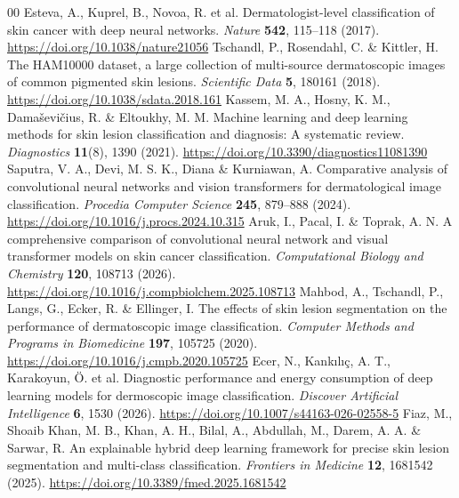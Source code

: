 \documentclass[conference]{IEEEtran}
\begin{document}
\begin{thebibliography}{00}
 Esteva, A., Kuprel, B., Novoa, R. et al. Dermatologist-level classification of skin cancer with deep neural networks. \textit{Nature} \textbf{542}, 115--118 (2017). \url{https://doi.org/10.1038/nature21056}
 Tschandl, P., Rosendahl, C. \& Kittler, H. The HAM10000 dataset, a large collection of multi-source dermatoscopic images of common pigmented skin lesions. \textit{Scientific Data} \textbf{5}, 180161 (2018). \url{https://doi.org/10.1038/sdata.2018.161}
 Kassem, M. A., Hosny, K. M., Damaševičius, R. \& Eltoukhy, M. M. Machine learning and deep learning methods for skin lesion classification and diagnosis: A systematic review. \textit{Diagnostics} \textbf{11}(8), 1390 (2021). \url{https://doi.org/10.3390/diagnostics11081390}
 Saputra, V. A., Devi, M. S. K., Diana \& Kurniawan, A. Comparative analysis of convolutional neural networks and vision transformers for dermatological image classification. \textit{Procedia Computer Science} \textbf{245}, 879--888 (2024). \url{https://doi.org/10.1016/j.procs.2024.10.315}
 Aruk, I., Pacal, I. \& Toprak, A. N. A comprehensive comparison of convolutional neural network and visual transformer models on skin cancer classification. \textit{Computational Biology and Chemistry} \textbf{120}, 108713 (2026). \url{https://doi.org/10.1016/j.compbiolchem.2025.108713}
 Mahbod, A., Tschandl, P., Langs, G., Ecker, R. \& Ellinger, I. The effects of skin lesion segmentation on the performance of dermatoscopic image classification. \textit{Computer Methods and Programs in Biomedicine} \textbf{197}, 105725 (2020). \url{https://doi.org/10.1016/j.cmpb.2020.105725}
 Ecer, N., Kankılıç, A. T., Karakoyun, Ö. et al. Diagnostic performance and energy consumption of deep learning models for dermoscopic image classification. \textit{Discover Artificial Intelligence} \textbf{6}, 1530 (2026). \url{https://doi.org/10.1007/s44163-026-02558-5}
 Fiaz, M., Shoaib Khan, M. B., Khan, A. H., Bilal, A., Abdullah, M., Darem, A. A. \& Sarwar, R. An explainable hybrid deep learning framework for precise skin lesion segmentation and multi-class classification. \textit{Frontiers in Medicine} \textbf{12}, 1681542 (2025). \url{https://doi.org/10.3389/fmed.2025.1681542}
\end{thebibliography}
\end{document}
